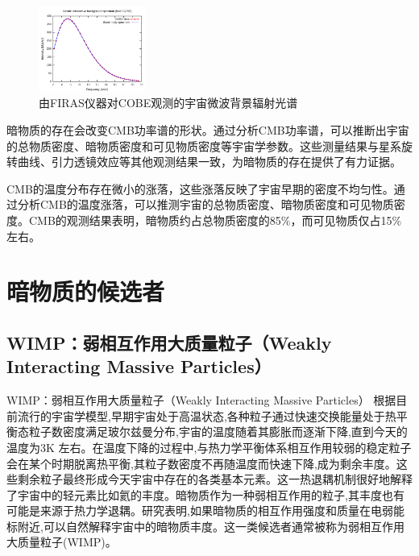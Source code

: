 \documentclass{beamer} %
\begin{document}
\begin{frame}
\begin{figure}[!htbp]
    \centering    
    \includegraphics[height=2.8cm]{Img/2-3.png}
    \caption{由FIRAS仪器对COBE观测的宇宙微波背景辐射光谱 }
    \label{2-3}
\end{figure}

暗物质的存在会改变CMB功率谱的形状。通过分析CMB功率谱，可以推断出宇宙的总物质密度、暗物质密度和可见物质密度等宇宙学参数。这些测量结果与星系旋转曲线、引力透镜效应等其他观测结果一致，为暗物质的存在提供了有力证据。

CMB的温度分布存在微小的涨落，这些涨落反映了宇宙早期的密度不均匀性。通过分析CMB的温度涨落，可以推测宇宙的总物质密度、暗物质密度和可见物质密度。CMB的观测结果表明，暗物质约占总物质密度的85\%，而可见物质仅占15\%左右。
\end{frame}

\section{暗物质的候选者}

\subsection{WIMP：弱相互作用大质量粒子（Weakly Interacting Massive Particles）}

\begin{frame}{WIMP：弱相互作用大质量粒子（Weakly Interacting Massive Particles）}
根据目前流行的宇宙学模型,早期宇宙处于高温状态,各种粒子通过快速交换能量处于热平衡态粒子数密度满足玻尔兹曼分布,宇宙的温度随着其膨胀而逐渐下降,直到今天的温度为3K 左右。在温度下降的过程中,与热力学平衡体系相互作用较弱的稳定粒子会在某个时期脱离热平衡,其粒子数密度不再随温度而快速下降,成为剩余丰度。这些剩余粒子最终形成今天宇宙中存在的各类基本元素。这一热退耦机制很好地解释了宇宙中的轻元素比如氦的丰度。暗物质作为一种弱相互作用的粒子,其丰度也有可能是来源于热力学退耦。研究表明,如果暗物质的相互作用强度和质量在电弱能标附近,可以自然解释宇宙中的暗物质丰度。这一类候选者通常被称为弱相互作用大质量粒子(WIMP)。
\end{frame}
\end{document}
